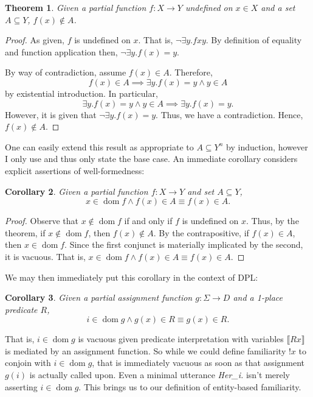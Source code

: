 \documentclass[11pt]{article}
\newtheorem{theorem}{Theorem}
\newtheorem{corollary}[theorem]{Corollary}
\DeclareMathOperator{\dom}{dom}
\begin{document}
\begin{theorem}
	Given a partial function \(f : X \to Y\) undefined on \(x \in X\) and a set \(A \subseteq Y\), \(f(x) \not\in A\).
\end{theorem}
\begin{proof}
	As given, \(f\) is undefined on \(x\). That is, \(\lnot \exists y . fxy\). By definition of equality and function application then, \(\lnot \exists y . f(x) = y\).

	By way of contradiction, assume \(f(x) \in A\). Therefore,
	\[f(x) \in A \implies \exists y . f(x) = y \land y \in A\]
	by existential introduction. In particular,
	\[\exists y . f(x) = y \land y \in A \implies \exists y . f(x) = y.\]
	However, it is given that \(\lnot \exists y . f(x) = y\). Thus, we have a contradiction. Hence, \(f(x) \not\in A\).
\end{proof}

One can easily extend this result as appropriate to \(A \subseteq Y^n\) by induction, however I only use and thus only state the base case. An immediate corollary considers explicit assertions of well-formedness:

\begin{corollary}
	Given a partial function \(f : X \to Y\) and set \(A \subseteq Y\),
	\[x \in \dom f \land f(x) \in A \equiv f(x) \in A.\]
\end{corollary}
\begin{proof}
	Observe that \(x \not\in \dom f\) if and only if \(f\) is undefined on \(x\). Thus, by the theorem, if \(x \not\in \dom f\), then \(f(x) \not\in A\). By the contrapositive, if \(f(x) \in A\), then \(x \in \dom f\). Since the first conjunct is materially implicated by the second, it is vacuous. That is,
	\(x \in \dom f \land f(x) \in A \equiv f(x) \in A\).
\end{proof}

We may then immediately put this corollary in the context of DPL:

\begin{corollary}
	Given a partial assignment function \(g : \Sigma \to D\) and a 1-place predicate \(R\),
	\[i \in \dom g \land g(x) \in R \equiv g(x) \in R.\]
\end{corollary}

That is, \(i \in \dom g\) is vacuous given predicate interpretation with variables \(\llbracket R x \rrbracket\) is mediated by an assignment function. So while we could define familiarity \(!x\) to conjoin with \(i \in \dom g\), that is immediately vacuous as soon as that assignment \(g(i)\) is actually called upon. Even a minimal utterance \textit{Her_i.} isn't merely asserting \(i \in \dom g\). This brings us to our definition of entity-based familiarity.
\end{document}
